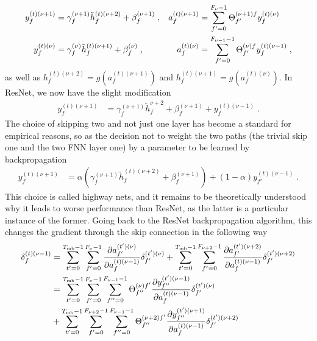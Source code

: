\begin{subappendices}
\begin{align}
y_{f}^{(t)(\nu+1)}&=\gamma_f^{(\nu+1)}\tilde{h}_f^{(t)(\nu+2)}+\beta_f^{(\nu+1)}\;,&
%
a_{f}^{(t)(\nu+1)}&=\sum^{F_{\nu}-1}_{f'=0}\Theta^{(\nu+1)f}_{f'}y_{f}^{(t)(\nu)}\notag\\
%
y_{f}^{(t)(\nu)}&=\gamma_f^{(\nu)}\tilde{h}_f^{(t)(\nu+1)}+\beta_f^{(\nu)}\;,&
%
a_{f}^{(t)(\nu)}&=\sum^{F_{\nu-1}-1}_{f'=0}\Theta^{(\nu)f}_{f'}y_{f}^{(t)(\nu-1)}\;,
\end{align}
as well as $h^{(t)(\nu+2)}_f=g\left(a_{f}^{(t)(\nu+1)}\right)$ and $h^{(t)(\nu+1)}_f=g\left(a_{f}^{(t)(\nu)}\right)$. In ResNet, we now have the slight modification
\begin{align}
y_{f}^{(t)(\nu+1)}&=\gamma_f^{(\nu+1)}\tilde{h}_f^{\nu+2}+\beta_f^{(\nu+1)}+y^{(t)(\nu-1)}_{f}\;.
\end{align}
The choice of skipping two and not just one layer has become a standard for empirical reasons, so as the decision not to weight the two paths (the trivial skip one and the two FNN layer one) by a parameter to be learned by backpropagation 
\begin{align}
y_{f}^{(t)(\nu+1)}&=\alpha\left(\gamma_f^{(\nu+1)}\tilde{h}_f^{(t)(\nu+2)}+\beta_f^{(\nu+1)}\right)
%
+\left( 1-\alpha\right)y^{(t)(\nu-1)}_{f'}\;.
\end{align}
This choice is called highway nets\cite{citeulike:14070430}, and it remains to be theoretically understood why it leads to worse performance than ResNet, as the latter is a particular instance of the former. Going back to the ResNet backpropagation algorithm, this changes the gradient through the skip connection in the following way
\begin{align}
\delta^{(t)(\nu-1)}_f&=
%
\sum_{t'=0}^{T_{{\rm mb}}-1}\sum_{f'=0}^{F_{\nu}-1}
%
 \frac{\partial  a_{f'}^{(t')(\nu)}}{\partial  a_{f}^{(t)(\nu-1)}} \delta^{(t')(\nu)}_{f'}
+\sum_{t'=0}^{T_{{\rm mb}}-1}\sum_{f'=0}^{F_{\nu+2}-1}
%
 \frac{\partial  a_{f'}^{(t')(\nu+2)}}{\partial  a_{f}^{(t)(\nu-1)}} \delta^{(t')(\nu+2)}_{f'}\notag\\
%
&=\sum_{t'=0}^{T_{{\rm mb}}-1}\sum_{f'=0}^{F_{\nu}-1}\sum^{F_{\nu-1}-1}_{f''=0}\Theta^{(\nu)f'}_{f''}
%
\frac{\partial y^{(t')(\nu-1)}_{f''} }{\partial  a_{f}^{(t)(\nu-1)}} \delta^{(t')(\nu)}_{f'}\notag\\
%
&+\sum_{t'=0}^{T_{{\rm mb}}-1}\sum_{f'=0}^{F_{\nu+2}-1}\sum^{F_{\nu-1}-1}_{f''=0}\Theta^{(\nu+2)f'}_{f''}
%
\frac{\partial y^{(t')(\nu+1)}_{f''} }{\partial  a_{f}^{(t)(\nu-1)}} \delta^{(t')(\nu+2)}_{f'}\notag\\

\end{align}
\end{subappendices}
